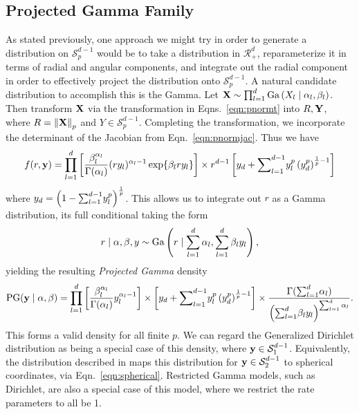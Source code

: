 \subsection{Projected Gamma Family}
As stated previously, one approach we might try in order to generate a distribution on
  $\mathcal{S}_{p}^{d-1}$ would be to take a distribution in $\mathcal{R}_{+}^d$, reparameterize
  it in terms of radial and angular components, and integrate out the radial component in order to
  effectively project the distribution onto $\mathcal{S}_{p}^{d-1}$.  A natural candidate distribution
  to accomplish this is the Gamma.  Let ${\bf X} \sim \prod_{l = 1}^d\text{Ga}\left(X_l\mid\alpha_l,\beta_l\right)$.
  Then transform ${\bf X}$ via the transformation in Eqns.~\ref{eqn:pnormt} into $R,{\bf Y}$, where
  $R = \left\lVert {\bf X} \right\rVert_{p}$ and $Y\in \mathcal{S}_{p}^{d-1}$.  Completing the transformation, we
  incorporate the determinant of the Jacobian from Eqn.~\ref{eqn:pnormjac}.  Thus we have
  \begin{equation}
    \label{eqn:protopg}
    f(r,{\bf y}) = \prod_{l = 1}^{d}
      \left[\frac{\beta_l^{\alpha_l}}{\Gamma(\alpha_l)}(ry_l)^{\alpha_l - 1}\exp\lbrace \beta_lry_l\rbrace\right]
      \times r^{d-1}\left[y_d + {\small \sum}_{l = 1}^{d-1}y_l^p\left(y_d^p\right)^{\frac{1}{p} - 1}\right]
  \end{equation}
  where $y_d = \left(1 - {\small \sum}_{l = 1}^{d-1}y_l^p\right)^{\frac{1}{p}}$.  This allows us to
  integrate out $r$ as a Gamma distribution, its full conditional taking the form
  \begin{equation}
    \label{eqn:rfullcond}
    r\mid{\bf \alpha},{\bf \beta}, y \sim \text{Ga}\left(r\mid\sum_{l = 1}^d \alpha_l, \sum_{l = 1}^d \beta_ly_l\right),
  \end{equation}
  yielding the resulting \emph{Projected Gamma} density
  \begin{equation}
    \text{PG}({\bf y}\mid{\bf \alpha},{\bf \beta}) = \prod_{l = 1}^d\left[\frac{\beta_l^{\alpha_l}}{\Gamma(\alpha_l)}y_l^{\alpha_l - 1}\right]
      \times \left[y_d + {\small \sum}_{l = 1}^{d-1}y_l^p\left(y_d^p\right)^{\frac{1}{p} - 1}\right]
      \times \frac{\Gamma({\small\sum}_{l = 1}^d\alpha_l)}{\left({\small\sum}_{l = 1}^d \beta_ly_l\right)^{{\small\sum_{l = 1}^d \alpha_l}}}.
  \end{equation}
  This forms a valid density for all finite $p$.  We can regard the Generalized Dirichlet distribution
  as being a special case of this density, where ${\bf y}\in \mathcal{S}_{1}^{d-1}$.  Equivalently,
  the distribution described in \cite{nunez2019} maps this distribution for ${\bf y}\in \mathcal{S}_{2}^{d-1}$
  to spherical coordinates, via Eqn.~\ref{eqn:spherical}. Restricted Gamma models, such as Dirichlet,
  are also a special case of this model, where we restrict the rate parameters to all be 1.

